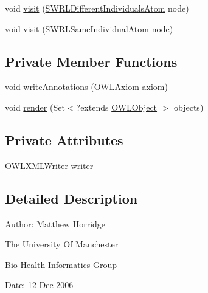 \begin{DoxyCompactItemize}
\item 
void \hyperlink{classorg_1_1coode_1_1owlapi_1_1owlxml_1_1renderer_1_1_o_w_l_x_m_l_object_renderer_ae206b828cdfd2d0708a8293898d2f258}{visit} (\hyperlink{interfaceorg_1_1semanticweb_1_1owlapi_1_1model_1_1_s_w_r_l_different_individuals_atom}{S\-W\-R\-L\-Different\-Individuals\-Atom} node)
\item 
void \hyperlink{classorg_1_1coode_1_1owlapi_1_1owlxml_1_1renderer_1_1_o_w_l_x_m_l_object_renderer_a1d4cd893916f97828d05b7d6e4431e8b}{visit} (\hyperlink{interfaceorg_1_1semanticweb_1_1owlapi_1_1model_1_1_s_w_r_l_same_individual_atom}{S\-W\-R\-L\-Same\-Individual\-Atom} node)
\end{DoxyCompactItemize}
\subsection*{Private Member Functions}
\begin{DoxyCompactItemize}
\item 
void \hyperlink{classorg_1_1coode_1_1owlapi_1_1owlxml_1_1renderer_1_1_o_w_l_x_m_l_object_renderer_a4dc060339ec74e869c51c1e52540954b}{write\-Annotations} (\hyperlink{interfaceorg_1_1semanticweb_1_1owlapi_1_1model_1_1_o_w_l_axiom}{O\-W\-L\-Axiom} axiom)
\item 
void \hyperlink{classorg_1_1coode_1_1owlapi_1_1owlxml_1_1renderer_1_1_o_w_l_x_m_l_object_renderer_adeb5842d1696f83d4ce70287a159bab0}{render} (Set$<$?extends \hyperlink{interfaceorg_1_1semanticweb_1_1owlapi_1_1model_1_1_o_w_l_object}{O\-W\-L\-Object} $>$ objects)
\end{DoxyCompactItemize}
\subsection*{Private Attributes}
\begin{DoxyCompactItemize}
\item 
\hyperlink{classorg_1_1coode_1_1owlapi_1_1owlxml_1_1renderer_1_1_o_w_l_x_m_l_writer}{O\-W\-L\-X\-M\-L\-Writer} \hyperlink{classorg_1_1coode_1_1owlapi_1_1owlxml_1_1renderer_1_1_o_w_l_x_m_l_object_renderer_ac0209507930e9b0d42b200c6e5121062}{writer}
\end{DoxyCompactItemize}


\subsection{Detailed Description}
Author\-: Matthew Horridge\par
 The University Of Manchester\par
 Bio-\/\-Health Informatics Group\par
 Date\-: 12-\/\-Dec-\/2006\par
 \par
 

